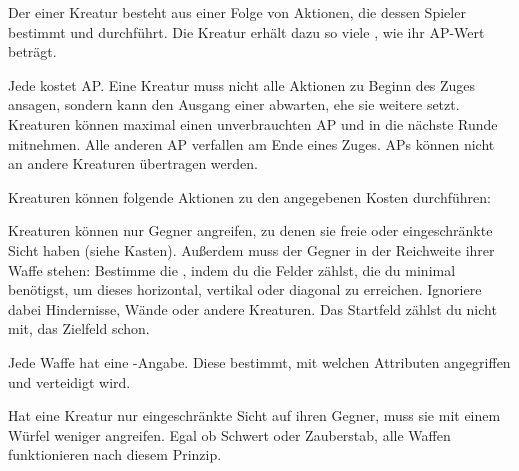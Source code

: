 {		Der  einer Kreatur besteht aus einer Folge von Aktionen, die dessen Spieler bestimmt und durchführt. Die Kreatur erhält dazu so viele , wie ihr AP-Wert beträgt.

		Jede  kostet AP. Eine Kreatur muss nicht alle Aktionen zu Beginn des Zuges ansagen, sondern kann den Ausgang einer abwarten, ehe sie weitere setzt. Kreaturen können maximal einen unverbrauchten AP  und in die nächste Runde mitnehmen. Alle anderen AP verfallen am Ende eines Zuges. APs können nicht an andere Kreaturen übertragen werden.

		Kreaturen können folgende Aktionen zu den angegebenen Kosten durchführen:

		\medskip
		\medskip

			Kreaturen können nur Gegner angreifen, zu denen sie freie oder eingeschränkte Sicht haben (siehe Kasten). Außerdem muss der Gegner in der Reichweite ihrer Waffe stehen: Bestimme die , indem du die Felder zählst, die du minimal benötigst, um dieses horizontal, vertikal oder diagonal zu erreichen. Ignoriere dabei Hindernisse, Wände oder andere Kreaturen. Das Startfeld zählst du nicht mit, das Zielfeld schon.

			Jede Waffe hat eine -Angabe. Diese bestimmt, mit welchen Attributen angegriffen und verteidigt wird.


			\noindent
			Hat eine Kreatur nur eingeschränkte Sicht auf ihren Gegner, muss sie mit einem Würfel weniger angreifen. Egal ob Schwert oder Zauberstab, alle Waffen funktionieren nach diesem Prinzip.

}
